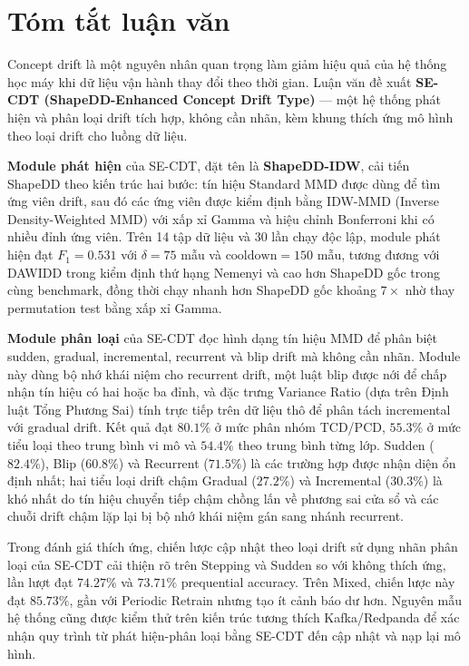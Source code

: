 \chapter*{Tóm tắt luận văn}

Concept drift là một nguyên nhân quan trọng làm giảm hiệu quả của hệ thống học máy khi dữ liệu vận hành thay đổi theo thời gian. Luận văn đề xuất \textbf{SE-CDT (ShapeDD-Enhanced Concept Drift Type)} --- một hệ thống phát hiện và phân loại drift tích hợp, không cần nhãn, kèm khung thích ứng mô hình theo loại drift cho luồng dữ liệu.

\textbf{Module phát hiện} của SE-CDT, đặt tên là \textbf{ShapeDD-IDW}, cải tiến ShapeDD theo kiến trúc hai bước: tín hiệu Standard MMD được dùng để tìm ứng viên drift, sau đó các ứng viên được kiểm định bằng IDW-MMD (Inverse Density-Weighted MMD) với xấp xỉ Gamma và hiệu chỉnh Bonferroni khi có nhiều đỉnh ứng viên. Trên 14 tập dữ liệu và 30 lần chạy độc lập, module phát hiện đạt $F_1 = 0.531$ với $\delta = 75$ mẫu và $\text{cooldown} = 150$ mẫu, tương đương với DAWIDD trong kiểm định thứ hạng Nemenyi và cao hơn ShapeDD gốc trong cùng benchmark, đồng thời chạy nhanh hơn ShapeDD gốc khoảng $7\times$ nhờ thay permutation test bằng xấp xỉ Gamma.

\textbf{Module phân loại} của SE-CDT đọc hình dạng tín hiệu MMD để phân biệt sudden, gradual, incremental, recurrent và blip drift mà không cần nhãn. Module này dùng bộ nhớ khái niệm cho recurrent drift, một luật blip được nới để chấp nhận tín hiệu có hai hoặc ba đỉnh, và đặc trưng Variance Ratio (dựa trên Định luật Tổng Phương Sai) tính trực tiếp trên dữ liệu thô để phân tách incremental với gradual drift. Kết quả đạt $80.1\%$ ở mức phân nhóm TCD/PCD, $55.3\%$ ở mức tiểu loại theo trung bình vi mô và $54.4\%$ theo trung bình từng lớp. Sudden ($82.4\%$), Blip ($60.8\%$) và Recurrent ($71.5\%$) là các trường hợp được nhận diện ổn định nhất; hai tiểu loại drift chậm Gradual ($27.2\%$) và Incremental ($30.3\%$) là khó nhất do tín hiệu chuyển tiếp chậm chồng lấn về phương sai cửa sổ và các chuỗi drift chậm lặp lại bị bộ nhớ khái niệm gán sang nhánh recurrent.

Trong đánh giá thích ứng, chiến lược cập nhật theo loại drift sử dụng nhãn phân loại của SE-CDT cải thiện rõ trên Stepping và Sudden so với không thích ứng, lần lượt đạt $74.27\%$ và $73.71\%$ prequential accuracy. Trên Mixed, chiến lược này đạt $85.73\%$, gần với Periodic Retrain nhưng tạo ít cảnh báo dư hơn. Nguyên mẫu hệ thống cũng được kiểm thử trên kiến trúc tương thích Kafka/Redpanda để xác nhận quy trình từ phát hiện-phân loại bằng SE-CDT đến cập nhật và nạp lại mô hình.

